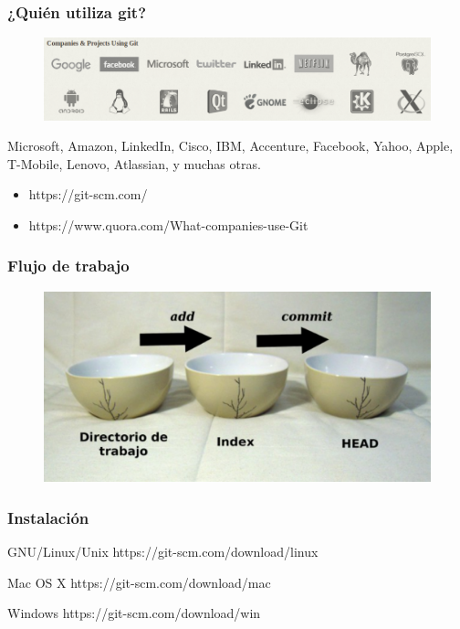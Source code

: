\documentclass{beamer}
\begin{document}
\begin{frame}
\frametitle{¿Quién utiliza git?}
\begin{figure}
\includegraphics[width=0.95\linewidth]{img/who.png}
\end{figure}
\vskip 0.5cm
\small
Microsoft, Amazon, LinkedIn, Cisco, IBM, Accenture, Facebook, Yahoo, Apple, T-Mobile, Lenovo, Atlassian, y muchas otras.
\small
\begin{itemize}
\item https://git-scm.com/
\item https://www.quora.com/What-companies-use-Git
\end{itemize}
\end{frame}

\begin{frame}
\frametitle{Flujo de trabajo}
\begin{figure}
\includegraphics[width=0.8\linewidth]{img/cuencos.png}
\end{figure}
\end{frame}

\begin{frame}
\frametitle{Instalación}
\begin{block}{GNU/Linux/Unix}
https://git-scm.com/download/linux
\end{block}
\vskip 0.50cm
\begin{block}{Mac OS X}
https://git-scm.com/download/mac
\end{block}
\vskip 0.50cm
\begin{block}{Windows}
https://git-scm.com/download/win
\end{block}
\end{frame}
\end{document}
